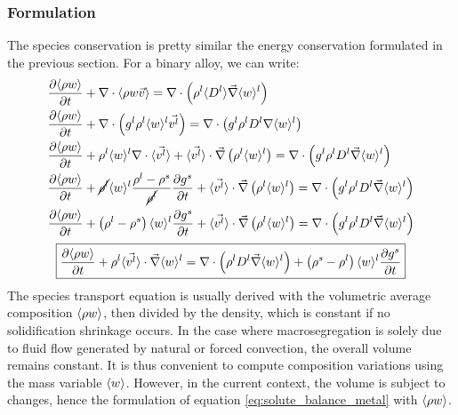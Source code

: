 \subsubsection{Formulation}
The species conservation is pretty similar the energy conservation formulated in the previous section. For a binary alloy, we can write:
%
\begin{subequations}
\begin{align}
	& \frac{\partial \langle \rho w \rangle}{\partial t} + \nabla \cdot \langle \rho w \vec{v} \rangle 
	= \nabla  \cdot \left( \rho^l \langle D^l \rangle \vec{\nabla} \langle w \rangle^l  \right) \\
	& \frac{\partial \langle \rho w \rangle}{\partial t} + \nabla \cdot \left( {g^l} \rho^l \langle w \rangle^l \vec{v^l} \right)
	= \nabla  \cdot \left( {g^l}\rho^l D^l \nabla \langle w \rangle^l  \right) \\ 
	& \frac{\partial \langle \rho w \rangle}{\partial t} 
		+ \rho^l \langle w \rangle^l  \nabla \cdot \langle \vec{v^l} \rangle
		+ \langle \vec{v^l} \rangle \cdot \vec{\nabla} \left( \rho^l \langle w \rangle^l \right)
		= \nabla  \cdot \left( {g^l} \rho^l D^l \vec{\nabla} \langle w \rangle^l  \right) \\   
	& \frac{\partial \langle \rho w \rangle}{\partial t} 
		+ \cancel{\rho^l} \langle w \rangle^l  \frac{\rho^l-\rho^s}{\cancel{\rho^l}} \frac{\partial  {g^s} }{\partial t}
		+ \langle \vec{v^l} \rangle \cdot \vec{\nabla} \left( \rho^l \langle w \rangle^l \right)
		= \nabla  \cdot \left( {g^l} \rho^l D^l \vec{\nabla} \langle w \rangle^l  \right) \\ 
	& \frac{\partial \langle \rho w \rangle}{\partial t} 
		+ \left( \rho^l-\rho^s \right) \langle w \rangle^l \frac{\partial  {g^s} }{\partial t}
		+ \langle \vec{v^l} \rangle \cdot \vec{\nabla} \left( \rho^l \langle w \rangle^l \right)
		= \nabla  \cdot \left( {g^l} \rho^l D^l \vec{\nabla} \langle w \rangle^l  \right)        
\end{align}
\end{subequations}
\begin{align}
\label{eq:solute_balance_metal}
 \boxed{ \frac{\partial \langle \rho w \rangle}{\partial t} 
		+ \rho^l \langle \vec{v^l} \rangle \cdot \vec{\nabla} \langle w \rangle^l
		= \nabla  \cdot \left( \rho^l D^l \vec{\nabla} \langle w \rangle^l  \right)
		+ \left( \rho^s-\rho^l \right) \langle w \rangle^l \frac{\partial  {g^s}}{\partial t}}
\end{align}
%
The species transport equation is usually derived with the volumetric average composition $\langle \rho w \rangle$, then
divided by the density, which is constant if no solidification shrinkage occurs. In the case where macrosegregation
is solely due to fluid flow generated by natural or forced convection, the overall
volume remains constant. It is thus convenient to compute composition variations using the mass variable $\langle w \rangle$.
However, in the current context, the volume is subject to changes, hence the formulation of equation 
\eqref{eq:solute_balance_metal} with $\langle \rho w \rangle$.
%
